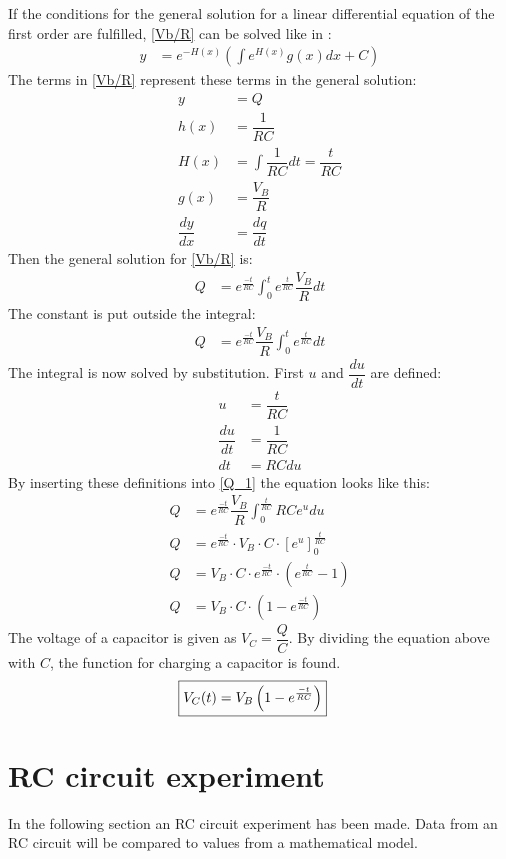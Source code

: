 If the conditions for the general solution for a linear differential equation of the first order are fulfilled, \eqref{Vb/R} can be solved like in :
\begin{align*}
y&=e^{-H(x)}\left(\int e^{H(x)}g(x)dx+C\right)
\end{align*}
The terms in \eqref{Vb/R} represent these terms in the general solution:
\begin{align*}
y &= Q
\\
h(x) &= \dfrac{1}{RC}
\\
H(x) &= \int \dfrac{1}{RC}dt=\dfrac{t}{RC}
\\
g(x) &= \dfrac{V_B}{R}
\\
\dfrac{dy}{dx} &= \dfrac{dq}{dt}
\end{align*}
Then the general solution for \eqref{Vb/R} is:
\begin{align*}
Q&= e^{\frac{-t}{RC}}\int_{0}^{t}e^{\frac{t}{RC}}\dfrac{V_B}{R}dt
\end{align*}
The constant is put outside the integral:
\begin{align}
Q&= e^{\frac{-t}{RC}}\dfrac{V_B}{R}\int_{0}^{t}e^{\frac{t}{RC}}dt \label{Q_1}
\end{align}
The integral is now solved by substitution. First $u$ and $\dfrac{du}{dt}$ are defined:
\begin{align*}
u &= \dfrac{t}{RC}
\\
\dfrac{du}{dt}&=\dfrac{1}{RC}
\\
dt &=RC du
\end{align*} 
By inserting these definitions into \eqref{Q_1} the equation looks like this:
\begin{align*}
Q &= e^{\frac{-t}{RC}}\dfrac{V_B}{R}\int_{0}^{\frac{t}{RC}}RCe^u du
\\
Q &= e^{\frac{-t}{RC}}\cdot V_B\cdot C\cdot \left[e^u\right]_{0}^{\frac{t}{RC}}
\\
Q &= V_B \cdot C\cdot e^{\frac{-t}{RC}}\cdot\left(e^{\frac{t}{RC}}-1\right)
\\
Q &= V_B \cdot C \cdot \left(1-e^{\frac{-t}{RC}}\right)
\end{align*} 
The voltage of a capacitor is given as $V_C=\dfrac{Q}{C}$. By dividing the equation above with $C$, the function for charging a capacitor is found.
\begin{align}
\label{V_up}
\Aboxed{
V_C(t)=V_B\left(1-e^{\frac{-t}{RC}}\right)
}
\end{align}
\section{RC circuit experiment}
In the following section an RC circuit experiment has been made. Data from an RC circuit will be compared to values from a mathematical model.
